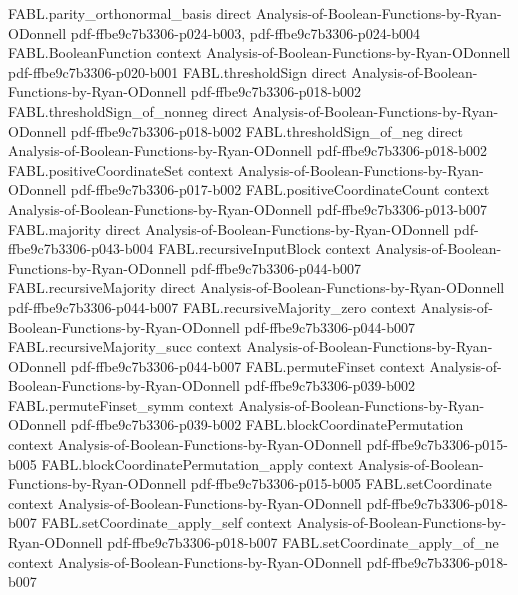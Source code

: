 \begin{theorem}
\proofstep
  {FABL.parity_orthonormal_basis}
  {direct}
  {Analysis-of-Boolean-Functions-by-Ryan-ODonnell}
  {pdf-ffbe9c7b3306-p024-b003,
    pdf-ffbe9c7b3306-p024-b004}
\proofstep
  {FABL.BooleanFunction}
  {context}
  {Analysis-of-Boolean-Functions-by-Ryan-ODonnell}
  {pdf-ffbe9c7b3306-p020-b001}
\proofstep
  {FABL.thresholdSign}
  {direct}
  {Analysis-of-Boolean-Functions-by-Ryan-ODonnell}
  {pdf-ffbe9c7b3306-p018-b002}
\proofstep
  {FABL.thresholdSign_of_nonneg}
  {direct}
  {Analysis-of-Boolean-Functions-by-Ryan-ODonnell}
  {pdf-ffbe9c7b3306-p018-b002}
\proofstep
  {FABL.thresholdSign_of_neg}
  {direct}
  {Analysis-of-Boolean-Functions-by-Ryan-ODonnell}
  {pdf-ffbe9c7b3306-p018-b002}
\proofstep
  {FABL.positiveCoordinateSet}
  {context}
  {Analysis-of-Boolean-Functions-by-Ryan-ODonnell}
  {pdf-ffbe9c7b3306-p017-b002}
\proofstep
  {FABL.positiveCoordinateCount}
  {context}
  {Analysis-of-Boolean-Functions-by-Ryan-ODonnell}
  {pdf-ffbe9c7b3306-p013-b007}
\proofstep
  {FABL.majority}
  {direct}
  {Analysis-of-Boolean-Functions-by-Ryan-ODonnell}
  {pdf-ffbe9c7b3306-p043-b004}
\proofstep
  {FABL.recursiveInputBlock}
  {context}
  {Analysis-of-Boolean-Functions-by-Ryan-ODonnell}
  {pdf-ffbe9c7b3306-p044-b007}
\proofstep
  {FABL.recursiveMajority}
  {direct}
  {Analysis-of-Boolean-Functions-by-Ryan-ODonnell}
  {pdf-ffbe9c7b3306-p044-b007}
\proofstep
  {FABL.recursiveMajority_zero}
  {context}
  {Analysis-of-Boolean-Functions-by-Ryan-ODonnell}
  {pdf-ffbe9c7b3306-p044-b007}
\proofstep
  {FABL.recursiveMajority_succ}
  {context}
  {Analysis-of-Boolean-Functions-by-Ryan-ODonnell}
  {pdf-ffbe9c7b3306-p044-b007}
\proofstep
  {FABL.permuteFinset}
  {context}
  {Analysis-of-Boolean-Functions-by-Ryan-ODonnell}
  {pdf-ffbe9c7b3306-p039-b002}
\proofstep
  {FABL.permuteFinset_symm}
  {context}
  {Analysis-of-Boolean-Functions-by-Ryan-ODonnell}
  {pdf-ffbe9c7b3306-p039-b002}
\proofstep
  {FABL.blockCoordinatePermutation}
  {context}
  {Analysis-of-Boolean-Functions-by-Ryan-ODonnell}
  {pdf-ffbe9c7b3306-p015-b005}
\proofstep
  {FABL.blockCoordinatePermutation_apply}
  {context}
  {Analysis-of-Boolean-Functions-by-Ryan-ODonnell}
  {pdf-ffbe9c7b3306-p015-b005}
\proofstep
  {FABL.setCoordinate}
  {context}
  {Analysis-of-Boolean-Functions-by-Ryan-ODonnell}
  {pdf-ffbe9c7b3306-p018-b007}
\proofstep
  {FABL.setCoordinate_apply_self}
  {context}
  {Analysis-of-Boolean-Functions-by-Ryan-ODonnell}
  {pdf-ffbe9c7b3306-p018-b007}
\proofstep
  {FABL.setCoordinate_apply_of_ne}
  {context}
  {Analysis-of-Boolean-Functions-by-Ryan-ODonnell}
  {pdf-ffbe9c7b3306-p018-b007}
\proofstep

\end{theorem}
